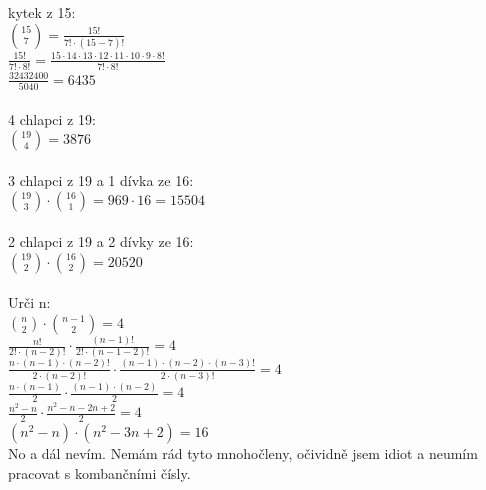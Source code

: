 \documentclass[varwidth, border=5mm, preview]{standalone}
\begin{document}
\fontsize{18pt}{18pt} kytek z 15:\\
$\binom{15}{7} = \frac{15!}{7! \cdot (15-7)!}$\\
$\frac{15!}{7! \cdot 8!} = \frac{15 \cdot 14  \cdot 13  \cdot 12  \cdot 11  \cdot 10  \cdot 9  \cdot 8!}{7!  \cdot 8!}$\\
$\frac{32432400}{5040} = 6435$\\
\vspace{1em}\\
4 chlapci z 19:\\
$\binom{19}{4} = 3876$\\
\vspace{1em}\\
3 chlapci z 19 a 1 dívka ze 16:\\
$\binom{19}{3} \cdot \binom{16}{1} = 969 \cdot 16 = 15504$\\
\vspace{1em}\\
2 chlapci z 19 a 2 dívky ze 16:\\
$\binom{19}{2} \cdot \binom{16}{2} = 20520$\\
\vspace{1em}\\
Urči n:\\
$\binom{n}{2} \cdot \binom{n-1}{2} = 4$\\
$\frac{n!}{2! \cdot (n-2)!} \cdot \frac{(n-1)!}{2! \cdot (n-1-2)!} = 4$\\
$\frac{n \cdot (n-1) \cdot (n-2)!}{2 \cdot (n-2)!} \cdot \frac{(n-1) \cdot (n-2) \cdot (n-3)!}{2 \cdot (n-3)!} = 4$\\
$\frac{n \cdot (n-1)}{2} \cdot \frac{(n-1) \cdot (n-2)}{2} = 4$\\
$\frac{n^2-n}{2} \cdot \frac{n^2-n-2n+2}{2} = 4$\\
$(n^2 - n) \cdot (n^2 - 3n + 2) = 16$\\
No a dál nevím. Nemám rád tyto mnohočleny, očividně jsem idiot a neumím pracovat s kombančními čísly.
\end{document}
